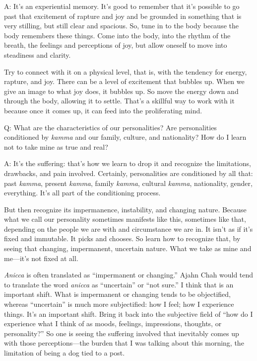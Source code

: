 \qaspace
A: It’s an experiential memory. It’s good to remember that it’s possible
to go past that excitement of rapture and joy and be grounded in
something that is very stilling, but still clear and spacious. So, tune
in to the body because the body remembers these things. Come into the
body, into the rhythm of the breath, the feelings and perceptions of
joy, but allow oneself to move into steadiness and clarity.

Try to connect with it on a physical level, that is, with the tendency
for energy, rapture, and joy. There can be a level of excitement that
bubbles up. When we give an image to what joy does, it bubbles up. So
move the energy down and through the body, allowing it to settle. That’s
a skillful way to work with it because once it comes up, it can feed
into the proliferating mind.

\qaspace
Q: What are the characteristics of our personalities? Are personalities
conditioned by \emph{kamma} and our family, culture, and nationality?
How do I learn not to take mine as true and real?

\qaspace
A: It’s the suffering: that’s how we learn to drop it and recognize the
limitations, drawbacks, and pain involved. Certainly, personalities are
conditioned by all that: past \emph{kamma}, present \emph{kamma}, family
\emph{kamma}, cultural \emph{kamma}, nationality, gender, everything.
It’s all part of the conditioning process.

But then recognize its impermanence, instability, and changing nature.
Because what we call our personality sometimes manifests like this,
sometimes like that, depending on the people we are with and
circumstance we are in. It isn’t as if it’s fixed and immutable. It
picks and chooses. So learn how to recognize that, by seeing that
changing, impermanent, uncertain nature. What we take as mine and
me—it’s not fixed at all.

\emph{Anicca} is often translated as “impermanent or changing.” Ajahn
Chah would tend to translate the word \emph{anicca} as “uncertain” or
“not sure.” I think that is an important shift. What is impermanent or
changing tends to be objectified, whereas “uncertain” is much more
subjectified: how I feel; how I experience things. It’s an important
shift. Bring it back into the subjective field of “how do I experience
what I think of as moods, feelings, impressions, thoughts, or
personality?” So one is seeing the suffering involved that inevitably
comes up with those perceptions—the burden that I was talking about this
morning, the limitation of being a dog tied to a post.

